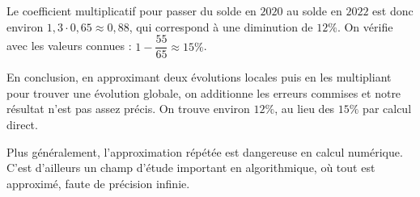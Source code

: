 \documentclass[a4paper, 14pt]{extarticle}
\theoremstyle{plain}
\theoremstyle{definition}
\begin{document}
{\begin{enumerate}
		Le coefficient multiplicatif pour passer du solde en $2020$ au solde en $2022$ est donc environ $1,3 \cdot 0,65 \approx 0,88$, qui correspond à une diminution de $12\%$.
		On vérifie avec les valeurs connues : $1-\dfrac{55}{65} \approx 15\%$.
		
	\end{enumerate}
		
	En conclusion, en approximant deux évolutions locales puis en les multipliant pour trouver une évolution globale, on additionne les erreurs commises et notre résultat n'est pas assez précis.
	On trouve environ $12\%$, au lieu des $15\%$ par calcul direct.
	
	Plus généralement, l'approximation répétée est dangereuse en calcul numérique. 
	C'est d'ailleurs un champ d'étude important en algorithmique, où tout est approximé, faute de précision infinie.
}
\end{document}
